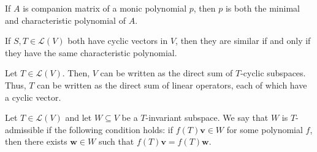 \documentclass[11pt]{article}
\renewcommand{\vec}[1]{\boldsymbol{#1}}
\newcommand{\vv}{\vec{v}}
\newcommand{\vw}{\vec{w}}
\newcommand{\alg}[1]{\mathscr{#1}}
\newcommand{\algL}{\alg{L}}
\theoremstyle{definition}
\theoremstyle{remark}
\numberwithin{equation}{section}
\begin{document}
    \begin{corollary}
        If $A$ is companion matrix of a monic polynomial $p$, then $p$ is both the
        minimal and characteristic polynomial of $A$.
    \end{corollary}

    \begin{corollary}
        If $S, T \in \algL(V)$ both have cyclic vectors in $V$, then they are similar
        if and only if they have the same characteristic polynomial.
    \end{corollary}

    \begin{theorem}
        Let $T \in \algL(V)$. Then, $V$ can be written as the direct sum of
        $T$-cyclic subspaces. Thus, $T$ can be written as the direct sum of linear
        operators, each of which have a cyclic vector.
    \end{theorem}

    \begin{definition}
        Let $T \in \algL(V)$ and let $W \subseteq V$ be a $T$-invariant subspace. We
        say that $W$ is $T$-admissible if the following condition holds: if $f(T) \vv
        \in W$ for some polynomial $f$, then there exists $\vw \in W$ such that
        $f(T)\vv = f(T)\vw$.
    \end{definition}
\end{document}
